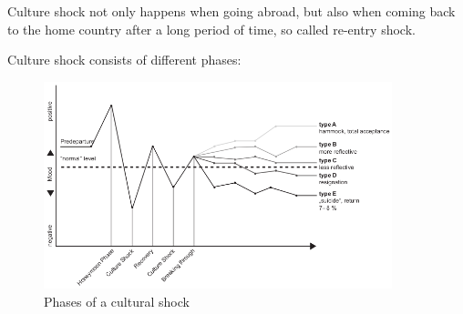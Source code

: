 Culture shock not only happens when going abroad, but also when coming back to the home country after a long period of time, so called re-entry shock.

Culture shock consists of different phases:
\begin{figure}[H]
	\centering
	\includegraphics[width=0.9\textwidth]{figures/culturalShockPhases.png}
	\caption{Phases of a cultural shock}
\end{figure}

